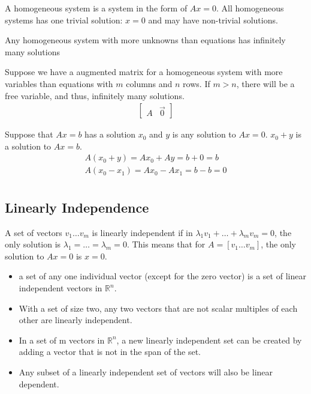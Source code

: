 \documentclass{article}
\theoremstyle{mytheoremstyle}
\theoremstyle{mytheoremstyle}
\theoremstyle{myproblemstyle}
\begin{document}
    A homogeneous system is a system in the form of $Ax = 0$. All homogeneous
    systems has one trivial solution: $x=0$ and may have non-trivial solutions.

    \begin{theorem}
        Any homogeneous system with more unknowns than equations has infinitely
        many solutions
    \end{theorem}

    Suppose we have a augmented matrix for a homogeneous system with more
    variables than equations with $m$ columns and $n$ rows. If $m>n$, there will
    be a free variable, and thus, infinitely many solutions.
    \begin{align*}
        \begin{bmatrix}
            A & \vec{0}
        \end{bmatrix}
    \end{align*}

    Suppose that $Ax=b$ has a solution $x_0$ and $y$ is any solution to $Ax=0$.
    $x_0 + y$ is a solution to $Ax=b$.
    \begin{align*}
        A(x_0+y) = Ax_0 + Ay = b+0 = b \\
        A(x_0-x_1) = Ax_0 - Ax_1 = b-b = 0 \\
    \end{align*}

    \subsection*{Linearly Independence}
    A set of vectors $v_1\dots v_m$ is linearly independent if in $\lambda_1 v_1
    + \dots + \lambda_m v_m = 0$, the only solution is $\lambda_1 = \dots =
    \lambda_m = 0$. This means that for $A=[v_1 \dots v_m]$, the only solution
    to $Ax=0$ is $x=0$.

    \begin{itemize}
        \item a set of any one individual vector (except for the zero vector) is
            a set of linear independent vectors in $\mathbb{R}^n$.

        \item With a set of size two, any two vectors that are not scalar
            multiples of each other are linearly independent.

        \item In a set of m vectors in $\mathbb{R}^n$, a new linearly
            independent set can be created by adding a vector that is not in the
            span of the set.

        \item  Any subset of a linearly independent set of vectors will also be
            linear dependent.
    \end{itemize}
\end{document}
